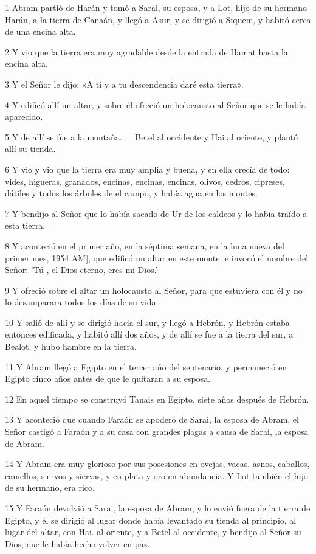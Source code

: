 \par 1 Abram partió de Harán y tomó a Sarai, su esposa, y a Lot, hijo de su hermano Harán, a la tierra de Canaán, y llegó a Asur, y se dirigió a Siquem, y habitó cerca de una encina alta.
\par 2 Y vio que la tierra era muy agradable desde la entrada de Hamat hasta la encina alta.
\par 3 Y el Señor le dijo: «A ti y a tu descendencia daré esta tierra».
\par 4 Y edificó allí un altar, y sobre él ofreció un holocausto al Señor que se le había aparecido.
\par 5 Y de allí se fue a la montaña. . . Betel al occidente y Hai al oriente, y plantó allí su tienda.
\par 6 Y vio y vio que la tierra era muy amplia y buena, y en ella crecía de todo: vides, higueras, granados, encinas, encinas, encinas, olivos, cedros, cipreses, dátiles y todos los árboles de el campo, y había agua en los montes.
\par 7 Y bendijo al Señor que lo había sacado de Ur de los caldeos y lo había traído a esta tierra.
\par 8 Y aconteció en el primer año, en la séptima semana, en la luna nueva del primer mes, 1954 AM], que edificó un altar en este monte, e invocó el nombre del Señor: 'Tú , el Dios eterno, eres mi Dios.'
\par 9 Y ofreció sobre el altar un holocausto al Señor, para que estuviera con él y no lo desamparara todos los días de su vida.
\par 10 Y salió de allí y se dirigió hacia el sur, y llegó a Hebrón, y Hebrón estaba entonces edificada, y habitó allí dos años, y de allí se fue a la tierra del sur, a Bealot, y hubo hambre en la tierra.
\par 11 Y Abram llegó a Egipto en el tercer año del septenario, y permaneció en Egipto cinco años antes de que le quitaran a su esposa.
\par 12 En aquel tiempo se construyó Tanais en Egipto, siete años después de Hebrón.
\par 13 Y aconteció que cuando Faraón se apoderó de Sarai, la esposa de Abram, el Señor castigó a Faraón y a su casa con grandes plagas a causa de Sarai, la esposa de Abram.
\par 14 Y Abram era muy glorioso por sus posesiones en ovejas, vacas, asnos, caballos, camellos, siervos y siervas, y en plata y oro en abundancia. Y Lot también el hijo de su hermano, era rico.
\par 15 Y Faraón devolvió a Sarai, la esposa de Abram, y lo envió fuera de la tierra de Egipto, y él se dirigió al lugar donde había levantado su tienda al principio, al lugar del altar, con Hai. al oriente, y a Betel al occidente, y bendijo al Señor su Dios, que le había hecho volver en paz.
